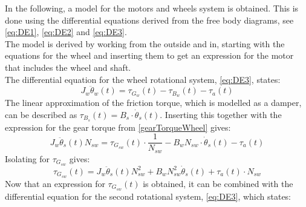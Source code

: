 In the following, a model for the motors and wheels system is obtained. This is done using the differential equations derived from the free body diagrams, see \autoref{eq:DE1}, \autoref{eq:DE2} and \autoref{eq:DE3}.
\\The model is derived by working from the outside and in, starting with the equations for the wheel and inserting them to get an expression for the motor that includes the wheel and shaft.\\
The differential equation for the wheel rotational system, \autoref{eq:DE3}, states:
\begin{equation}
J_w\ddot\theta_w(t) = \tau_{G_{w}}(t) - \tau_{B_w}(t) - \tau_a(t) \nonumber
\end{equation}
The linear approximation of the friction torque, which is modelled as a damper, can be described as $\tau_{B_s}(t) = B_s \cdot \dot\theta_s(t)$. Inserting this together with the expression for the gear torque from \autoref{gearTorqueWheel} gives:
\begin{equation}
J_w \ddot\theta_s(t) N_{sw} = \tau_{G_{sw}}(t)\cdot \frac{1}{N_{sw}} - {B_{w}} N_{sw} \cdot \dot\theta_{s}(t) -\tau_{a}(t)
\end{equation}
Isolating for $\tau_{G_{sw}}$ gives:
\begin{equation}
\tau_{G_{sw}}(t) = J_w \ddot\theta_s(t) N_{sw}^2 + B_wN_{sw}^2\dot\theta_s(t) + \tau_a(t) \cdot N_{sw}
\label{tauGSW}
\end{equation}
Now that an expression for $\tau_{G_{sw}}(t)$ is obtained, it can be combined with the differential equation for the second rotational system, \autoref{eq:DE3}, which states:
